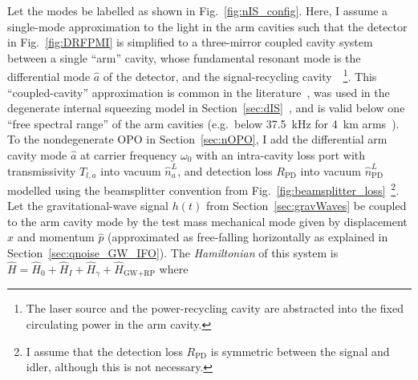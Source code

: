 Let the modes be labelled as shown in Fig.~\ref{fig:nIS_config}. 
Here, I assume a single-mode approximation to the light in the arm cavities such that the detector in Fig.~\ref{fig:DRFPMI} is simplified to a three-mirror coupled cavity system between a single ``arm'' cavity, whose fundamental resonant mode is the differential mode $\hat a$ of the detector, and the signal-recycling cavity~\cite{}~\footnote{The laser source and the power-recycling cavity are abstracted into the fixed circulating power in the arm cavity.}. This ``coupled-cavity'' approximation is common in the literature~\cite{adyaQuantumEnhancedKHz2020,liBroadbandSensitivityImprovement2020,miaoEnhancingBandwidthGravitationalWave2015,}, was used in the degenerate internal squeezing model in Section~\ref{sec:dIS}~\cite{korobkoQuantumExpanderGravitationalwave2019}, and is valid below one ``free spectral range'' of the arm cavities (e.g.\ below 37.5~kHz for 4~km arms~\cite{miaoEnhancingBandwidthGravitationalWave2015,}).
To the nondegenerate OPO in Section~\ref{sec:nOPO}, I add the differential arm cavity mode $\hat a$ at carrier frequency $\omega_0$ with an intra-cavity loss port with transmissivity $T_{l,a}$ into vacuum $\hat n^L_a$, and detection loss $R_\text{PD}$ into vacuum $\hat n^L_\text{PD}$ modelled using the beamsplitter convention from Fig.~\ref{fig:beamsplitter_loss}~\footnote{I assume that the detection loss $R_\text{PD}$ is symmetric between the signal and idler, although this is not necessary.}. Let the gravitational-wave signal $h(t)$ from Section~\ref{sec:gravWaves} be coupled to the arm cavity mode by the test mass mechanical mode given by displacement $\hat x$ and momentum $\hat p$ (approximated as free-falling horizontally as explained in Section~\ref{sec:qnoise_GW_IFO}).
The \emph{Hamiltonian} of this system is $\hat H = \hat H_0 + \hat H_I + \hat H_\gamma + \hat H_\text{GW+RP}$ where~\cite{} 
